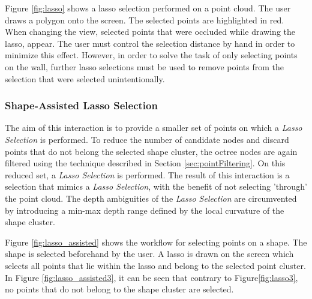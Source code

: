 Figure \ref{fig:lasso} shows a lasso selection performed on a point cloud. The user draws a polygon onto the screen. The selected points are highlighted in red. When changing the view, selected points that were occluded while drawing the lasso, appear. The user must control the selection distance by hand in order to minimize this effect. However, in order to solve the task of only selecting points on the wall, further lasso selections must be used to remove points from the selection that were selected unintentionally. 


\subsubsection{Shape-Assisted Lasso Selection}

The aim of this interaction is to provide a smaller set of points on which a \textit{Lasso Selection} is performed.  To reduce the number of candidate nodes and discard points that do not belong the selected shape cluster, the octree nodes are again filtered using the technique described in Section \ref{sec:pointFiltering}. On this reduced set, a \textit{Lasso Selection} is performed. The result of this interaction is a selection that mimics a \textit{Lasso Selection}, with the benefit of not selecting 'through' the point cloud. The depth ambiguities of the \textit{Lasso Selection} are circumvented by introducing a min-max depth range defined by the local curvature of the shape cluster. 

Figure \ref{fig:lasso_assisted} shows the workflow for selecting points on a shape. The shape is selected beforehand by the user. A lasso is drawn on the screen which selects all points that lie within the lasso and belong to the selected point cluster. In Figure \ref{fig:lasso_assisted3}, it can be seen that contrary to Figure\ref{fig:lasso3}, no points that do not belong to the shape cluster are selected. 

